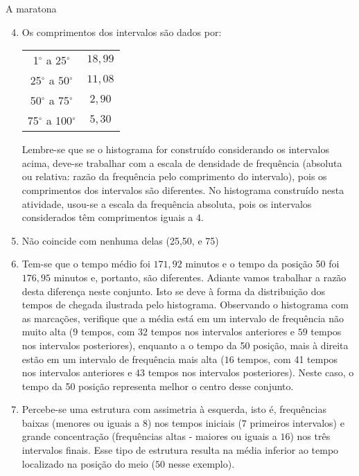 \begin{answer}{A maratona}
{
	\begin{enumerate}\setcounter{enumi}{3}
	\item Os comprimentos dos intervalos são dados por:
	\begin{table}[H]
	\centering
	\begin{tabular}{|c|c|}
	\hline
	\tcolor{Intervalo} & \tcolor{Comprimento} \\
	\hline
	1$^{\circ}$ a 25$^{\circ}$ & $18{,}99$ \\
	\hline
	25$^{\circ}$ a 50$^{\circ}$ & $11{,}08$ \\
	\hline
	50$^{\circ}$ a 75$^{\circ}$ & $2{,}90$ \\
	\hline
	75$^{\circ}$ a 100$^{\circ}$ & $5{,}30$ \\
	\hline
	\end{tabular}
	\end{table}

	Lembre-se que se o histograma for construído considerando os intervalos acima, deve-se trabalhar com a escala de densidade de frequência (absoluta ou relativa: razão da frequência pelo comprimento do intervalo), pois os comprimentos dos intervalos são diferentes. No histograma construído nesta atividade, usou-se a escala da frequência absoluta, pois os intervalos considerados têm comprimentos iguais a $4$.
	\item Não coincide com nenhuma delas (25,50, e 75)

	\item Tem-se que o tempo médio foi $171{,}92$ minutos e o tempo da posição 50 foi $176{,}95$ minutos e, portanto, são diferentes. Adiante vamos trabalhar a razão desta diferença neste conjunto. Isto se deve à forma da distribuição dos tempos de chegada ilustrada pelo histograma. Observando o histograma com as marcações, verifique que a média está em um intervalo de frequência não muito alta ($9$ tempos, com $32$ tempos nos intervalos anteriores e $59$ tempos nos intervalos posteriores), enquanto a o tempo da 50 posição, mais à direita estão em um intervalo de frequência mais alta ($16$ tempos, com 41 tempos nos intervalos anteriores e $43$ tempos nos intervalos posteriores). Neste caso, o tempo da 50 posição representa melhor o centro desse conjunto.

	\item Percebe-se uma estrutura com assimetria à esquerda, isto é, frequências baixas (menores ou iguais a 8) nos tempos iniciais ($7$ primeiros intervalos) e grande concentração (frequências altas - maiores ou iguais a $16$) nos três intervalos finais. Esse tipo de estrutura resulta na média inferior ao tempo localizado na posição do meio ($50$ nesse exemplo).


\end{enumerate}}
\end{answer}
